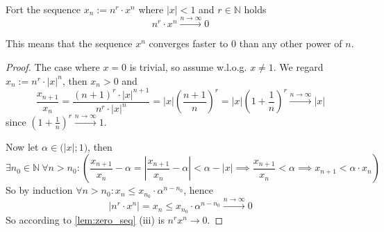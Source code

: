 \begin{proposition}
   Fort the sequence \(x_n := n^r \cdot x^n\) where \(|x| < 1\) and \(r \in \mathbb{N}\) holds
   \[n^r \cdot x^n \xrightarrow{n \to \infty} 0\]
\end{proposition}
\begin{remark}
   This means that the sequence \(x^n\) converges faster to 0 than any other power of \(n\).
\end{remark}
\begin{proof}
   The case where \(x = 0\) is trivial, so assume w.l.o.g. \(x \neq 1\).
   We regard \(x_n := n^r \cdot |x|^n\), then \(x_n > 0\) and
   \[\frac{x_{n+1}}{x_n} = \frac{(n+1)^r \cdot |x|^{n+1}}{n^r \cdot |x|^n} = |x| \left(\frac{n+1}{n}\right)^r = |x| \left(1 + \frac{1}{n}\right)^r \xrightarrow{n \to \infty} |x|\]
   since \(\left(1 + \frac{1}{n}\right)^r \xrightarrow{n \to \infty} 1\).

   Now let \(\alpha \in \big(|x|; 1\big)\), then
   \[\exists n_0 \in \mathbb{N}~\forall n > n_0: \left(\frac{x_{n+1}}{x_n} - \alpha = \left|\frac{x_{n+1}}{x_n} - \alpha\right| < \alpha - |x| \implies \frac{x_{n+1}}{x_n} < \alpha  \implies x_{n+1} < \alpha \cdot x_n\right)\]
   So by induction \(\forall n > n_0: x_n \leq x_{n_0} \cdot \alpha^{n - n_0}\), hence
   \[|n^r \cdot x^n| = x_n \leq x_{n_0} \cdot \alpha^{n-n_0} \xrightarrow{n \to \infty} 0\]
   So according to \cref{lem:zero_seq} (iii) is \(n^rx^n \to 0\).
\end{proof}


